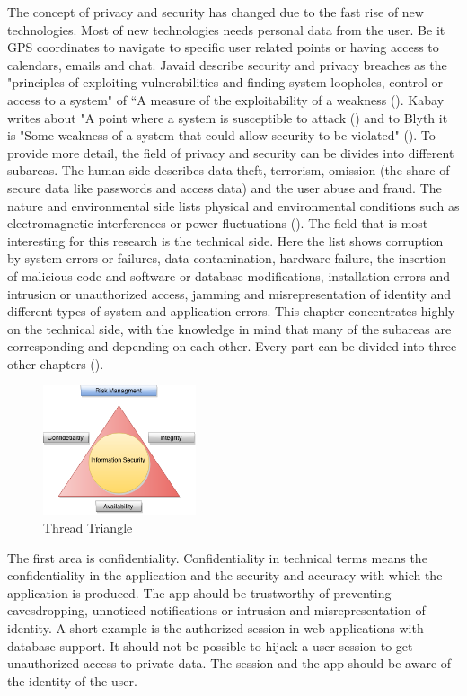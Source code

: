 The concept of privacy and security has changed due to the fast rise of new technologies. Most of new technologies needs personal data from the user. Be it GPS coordinates to navigate to specific user related points or having access to calendars, emails and chat. Javaid describe security and privacy breaches as the "principles of exploiting vulnerabilities and finding system loopholes, control or access to a system" of “A measure of the exploitability of a weakness (\cite{javaid2013cyber}). Kabay writes about "A point where a system is susceptible to attack (\cite{kabay1996enterprise}) and to Blyth it is "Some weakness of a system that could allow security to be violated" (\cite{blyth2001information}). To provide more detail, the field of privacy and security can be divides into different subareas. The human side describes data theft, terrorism, omission (the share of secure data like passwords and access data) and the user abuse and fraud. The nature and environmental side lists physical and environmental conditions such as electromagnetic interferences or power fluctuations (\cite{javaid2013cyber}). The field that is most interesting for this research is the technical side. Here the list shows corruption by system errors or failures, data contamination, hardware failure, the insertion of malicious code and software or database modifications, installation errors and intrusion or unauthorized access, jamming and misrepresentation of identity and different types of system and application errors. This chapter concentrates highly on the technical side, with the knowledge in mind that many of the subareas are corresponding and depending on each other. Every part can be divided into three other chapters (\cite{rubinstein2012regulating}).

\begin{figure}[h!]
  \centering
      \includegraphics[width=0.4\textwidth]{images/figure1_0.png}
  \caption{Thread Triangle}
\end{figure}


The first area is confidentiality. Confidentiality in technical terms means the confidentiality in the application and the security and accuracy with which the application is produced. The app should be trustworthy of preventing eavesdropping, unnoticed notifications or intrusion and misrepresentation of identity. A short example is the authorized session in web applications with database support. It should not be possible to hijack a user session to get unauthorized access to private data. The session and the app should be aware of the identity of the user.

